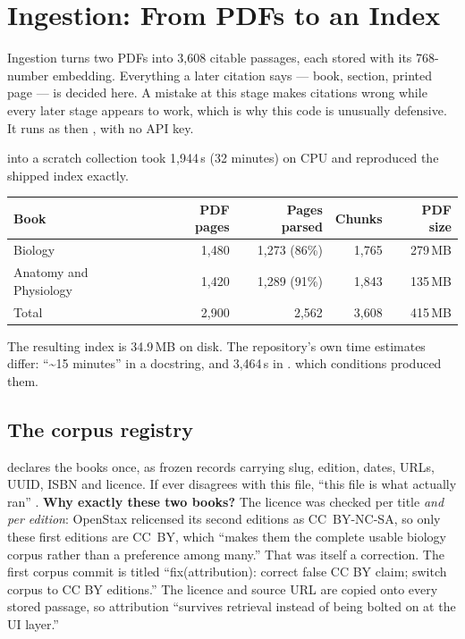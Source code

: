 \chapter{Ingestion: From PDFs to an Index}
\label{ch:ingestion}

Ingestion turns two PDFs into 3,608 citable passages, each stored with its 768-number embedding. Everything a later citation says --- book, section, printed page --- is decided here. A mistake at this stage makes citations wrong while every later stage appears to work, which is why this code is unusually defensive. It runs as  then , with no API key.

\begin{measured}
 into a scratch collection took 1,944\,s (32 minutes) on CPU and reproduced the shipped index exactly.
\begin{center}\small
\begin{tabular}{@{}lrrrr@{}}
\toprule
\textbf{Book} & \textbf{PDF pages} & \textbf{Pages parsed} & \textbf{Chunks} & \textbf{PDF size}\\
\midrule
Biology & 1,480 & 1,273 (86\%) & 1,765 & 279\,MB\\
Anatomy and Physiology & 1,420 & 1,289 (91\%) & 1,843 & 135\,MB\\
\midrule
Total & 2,900 & 2,562 & 3,608 & 415\,MB\\
\bottomrule
\end{tabular}
\end{center}
The resulting index is 34.9\,MB on disk. The repository's own time estimates differ: ``\textasciitilde15 minutes'' in a docstring, and 3,464\,s in . \NotDet{} which conditions produced them.
\end{measured}

\section{The corpus registry}

 declares the books once, as frozen  records carrying slug, edition, dates, URLs, UUID, ISBN and licence. If  ever disagrees with this file, \enquote{this file is what actually ran} . \textbf{Why exactly these two books?} The licence was checked per title \emph{and per edition}: OpenStax relicensed its second editions as CC~BY-NC-SA, so only these first editions are CC~BY, which ``makes them the complete usable biology corpus rather than a preference among many.'' That was itself a correction. The first corpus commit is titled \enquote{fix(attribution): correct false CC BY claim; switch corpus to CC BY editions.} The licence and source URL are copied onto every stored passage, so attribution ``survives retrieval instead of being bolted on at the UI layer.''

